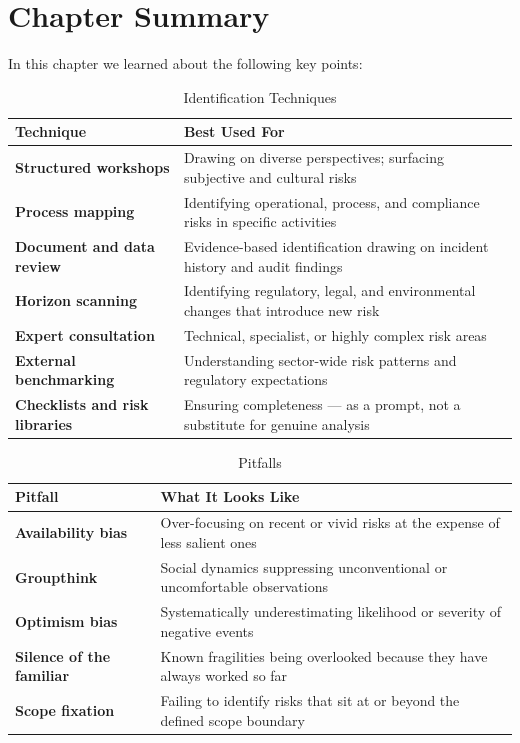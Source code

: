 \section{Chapter Summary}
In this chapter we learned about the following key points:
\begin{table}[H]
  \centering
  \renewcommand{\arraystretch}{1.5}
  \begin{tabularx}{\textwidth}{ | >{\raggedright\arraybackslash}p{} 
                                | >{\raggedright\arraybackslash}X | }
    \hline
    \textbf{Technique} & \textbf{Best Used For} \\
    \hline
    \textbf{Structured workshops} & Drawing on diverse perspectives; surfacing subjective and cultural risks\\
    \hline
    \textbf{Process mapping} & Identifying operational, process, and compliance risks in specific activities\\
    \hline
    \textbf{Document and data review} & Evidence-based identification drawing on incident history and audit findings\\
    \hline
    \textbf{Horizon scanning} & Identifying regulatory, legal, and environmental changes that introduce new risk\\
    \hline
    \textbf{Expert consultation} & Technical, specialist, or highly complex risk areas\\
    \hline
    \textbf{External benchmarking} & Understanding sector-wide risk patterns and regulatory expectations\\
    \hline
    \textbf{Checklists and risk libraries} & Ensuring completeness — as a prompt, not a substitute for genuine analysis\\
    \hline
  \end{tabularx}
  \caption{Identification Techniques}
\end{table}

\begin{table}[H]
  \centering
  \renewcommand{\arraystretch}{1.5}
  \begin{tabularx}{\textwidth}{ | >{\raggedright\arraybackslash}p{} 
                                | >{\raggedright\arraybackslash}X | }
    \hline
    \textbf{Pitfall} & \textbf{What It Looks Like} \\
    \hline
    \textbf{Availability bias} & Over-focusing on recent or vivid risks at the expense of less salient ones\\
    \hline
    \textbf{Groupthink} & Social dynamics suppressing unconventional or uncomfortable observations\\
    \hline
    \textbf{Optimism bias} & Systematically underestimating likelihood or severity of negative events\\
    \hline
    \textbf{Silence of the familiar} & Known fragilities being overlooked because they have always worked so far\\
    \hline
    \textbf{Scope fixation} & Failing to identify risks that sit at or beyond the defined scope boundary\\
    \hline
  \end{tabularx}
  \caption{Pitfalls}
\end{table}

